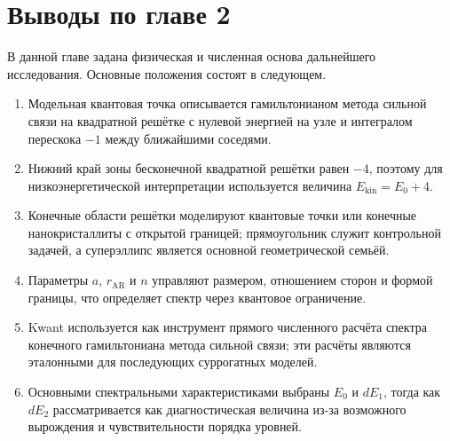 \section{Выводы по главе 2}

В данной главе задана физическая и численная основа дальнейшего исследования. Основные
положения состоят в следующем.

\begin{enumerate}
  \item Модельная квантовая точка описывается гамильтонианом метода сильной связи на
  квадратной решётке с нулевой энергией на узле и интегралом перескока $-1$ между
  ближайшими соседями.
  \item Нижний край зоны бесконечной квадратной решётки равен $-4$, поэтому для
  низкоэнергетической интерпретации используется величина $E_{\mathrm{kin}}=E_0+4$.
  \item Конечные области решётки моделируют квантовые точки или конечные нанокристаллиты с
  открытой границей; прямоугольник служит контрольной задачей, а суперэллипс является
  основной геометрической семьёй.
  \item Параметры $a$, $r_{\mathrm{AR}}$ и $n$ управляют размером, отношением сторон и
  формой границы, что определяет спектр через квантовое ограничение.
  \item Kwant используется как инструмент прямого численного расчёта спектра конечного
  гамильтониана метода сильной связи; эти расчёты являются эталонными для последующих
  суррогатных моделей.
  \item Основными спектральными характеристиками выбраны $E_0$ и $dE_1$, тогда как $dE_2$
  рассматривается как диагностическая величина из-за возможного вырождения и
  чувствительности порядка уровней.
\end{enumerate}

\clearpage
